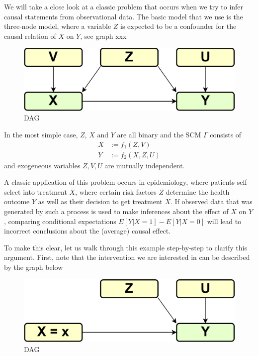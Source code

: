 \documentclass[
]{book}
\theoremstyle{definition}
\theoremstyle{definition}
\theoremstyle{definition}
\theoremstyle{remark}
\begin{document}
We will take a close look at a classic problem that occurs when we try to infer causal statements from observational data.
The basic model that we use is the three-node model, where a variable \(Z\) is expected to be a confounder for the causal relation of \(X\) on \(Y\), see graph xxx

\begin{figure}
\centering
\includegraphics{images/dag_confounder.png}
\caption{DAG}
\end{figure}

In the most simple case, \(Z\), \(X\) and \(Y\) are all binary and the SCM \(\Gamma\) consists of
\begin{align}
X &:= f_1(Z, V) \\
Y &:= f_2(X, Z, U)
\end{align}
and exogeneous variables \(Z, V, U\) are mutually independent.

A classic application of this problem occurs in epidemiology, where patients self-select into treatment \(X\), where certain risk factors \(Z\) determine the health outcome \(Y\) as well as their decision to get treatment \(X\). If observed data that was generated by such a process is used to make inferences about the effect of \(X\) on \(Y\), comparing conditional expectations \(E[Y|X = 1] - E[Y|X = 0]\) will lead to incorrect conclusions about the (average) causal effect.

To make this clear, let us walk through this example step-by-step to clarify this argument.
First, note that the intervention we are interested in can be described by the graph below

\begin{figure}
\centering
\includegraphics{images/dag_confounder_intervention.png}
\caption{DAG}
\end{figure}
\end{document}
